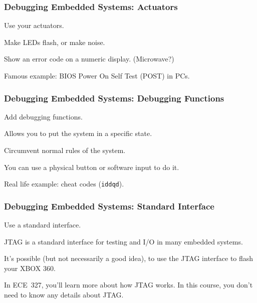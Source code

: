 \begin{frame}
\frametitle{Debugging Embedded Systems: Actuators}
\begin{changemargin}{1cm}

Use your actuators.

Make LEDs flash, or make noise.

Show an error code on a numeric display. (Microwave?)

Famous example: BIOS Power On Self Test (POST) in PCs. 

\end{changemargin}
\end{frame}

\begin{frame}
\frametitle{Debugging Embedded Systems: Debugging Functions}
\begin{changemargin}{1cm}

Add debugging functions.

Allows you to put the system in a specific state.

Circumvent normal rules of the system.

You can use a physical button or software input to do it. 

Real life example: cheat codes (\texttt{iddqd}). 

\end{changemargin}
\end{frame}

\begin{frame}
\frametitle{Debugging Embedded Systems: Standard Interface}
\begin{changemargin}{1cm}

Use a standard interface.

JTAG is a standard interface for testing and I/O in many embedded systems. 

It's possible (but not necessarily a good idea), to use the JTAG interface to flash your XBOX 360.

In ECE~327, you'll learn more about how JTAG works. In this course, you don't need to know any details about JTAG.

\end{changemargin}
\end{frame}






